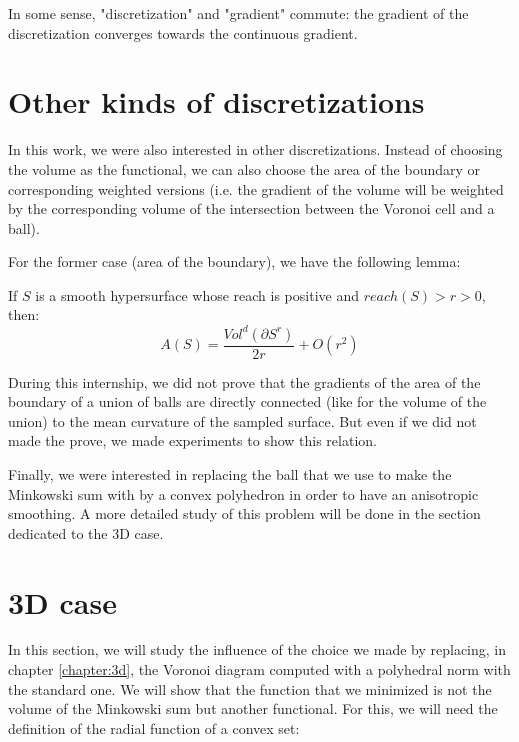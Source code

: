 In some sense, "discretization" and "gradient" commute: the gradient of the
discretization converges towards the continuous gradient.


\section{Other kinds of discretizations}


In this work, we were also interested in other discretizations. Instead of
choosing the volume as the functional, we can also choose the area of the
boundary or corresponding weighted versions (i.e. the gradient of the volume
will be weighted by the corresponding volume of the intersection between the
Voronoi cell and a ball).

For the former case (area of the boundary), we have the following lemma:
\begin{lemma}
    If $ S $ is a smooth hypersurface whose reach is positive and $ reach(S) > r
    > 0 $, then:
    \begin{equation}
        A(S) = \frac{Vol^d(\partial S^r)}{2r} + O(r^2)
    \end{equation}
\end{lemma}

During this internship, we did not prove that the gradients of the area of the
boundary of a union of balls are directly connected (like for the volume of the
union) to the mean curvature of the sampled surface. But even if we did not
made the prove, we made experiments to show this relation.

Finally, we were interested in replacing the ball that we use to make the
Minkowski sum with by a convex polyhedron in order to have an anisotropic
smoothing. A more detailed study of this problem will be done in the section
dedicated to the 3D case.

\section{3D case}

In this section, we will study the influence of the choice we made by replacing,
in chapter \ref{chapter:3d}, the Voronoi diagram computed with a polyhedral norm
with the standard one. We will show that the function that we minimized is not
the volume of the Minkowski sum but another functional. For this, we will need
the definition of the radial function of a convex set:

